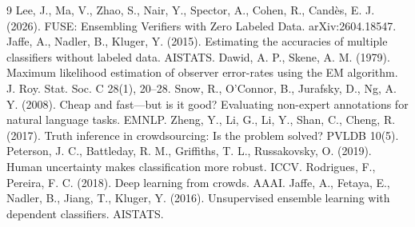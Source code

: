 \documentclass[10pt]{article}
\begin{document}
\begin{thebibliography}{9}\footnotesize\setlength{\itemsep}{0pt}
 Lee, J., Ma, V., Zhao, S., Nair, Y., Spector, A., Cohen, R., Cand\`es, E. J. (2026). FUSE: Ensembling Verifiers with Zero Labeled Data. arXiv:2604.18547.
 Jaffe, A., Nadler, B., Kluger, Y. (2015). Estimating the accuracies of multiple classifiers without labeled data. AISTATS.
 Dawid, A. P., Skene, A. M. (1979). Maximum likelihood estimation of observer error-rates using the EM algorithm. J. Roy. Stat. Soc. C 28(1), 20--28.
 Snow, R., O'Connor, B., Jurafsky, D., Ng, A. Y. (2008). Cheap and fast---but is it good? Evaluating non-expert annotations for natural language tasks. EMNLP.
 Zheng, Y., Li, G., Li, Y., Shan, C., Cheng, R. (2017). Truth inference in crowdsourcing: Is the problem solved? PVLDB 10(5).
 Peterson, J. C., Battleday, R. M., Griffiths, T. L., Russakovsky, O. (2019). Human uncertainty makes classification more robust. ICCV.
 Rodrigues, F., Pereira, F. C. (2018). Deep learning from crowds. AAAI.
 Jaffe, A., Fetaya, E., Nadler, B., Jiang, T., Kluger, Y. (2016). Unsupervised ensemble learning with dependent classifiers. AISTATS.
\end{thebibliography}
\end{document}
